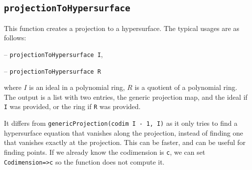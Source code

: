 \documentclass[11pt]{amsart}
\theoremstyle{definition}
\begin{document}
\subsection{\tt projectionToHypersurface} This function creates a projection to a hypersurface. The typical usages are as follows: 

\vspace{1em}
-- {\tt projectionToHypersurface I},

-- {\tt projectionToHypersurface R} 

\vspace{1em}
\noindent where $I$ is an ideal in a polynomial ring, $R$ is a quotient of a polynomial ring. The output is
a list with two entries, the generic projection map, and the ideal if {\tt I} was provided, or the ring if {\tt R} was provided.

It differs from {\tt genericProjection(codim I - 1, I)} as it only tries to find a hypersurface equation that vanishes along the projection, instead of finding one that vanishes exactly at the projection.  This can be faster, and can be useful for finding points.   If we already know the codimension is {\tt c}, we can set {\tt Codimension=>c} so the function does not compute it. 
\end{document}
